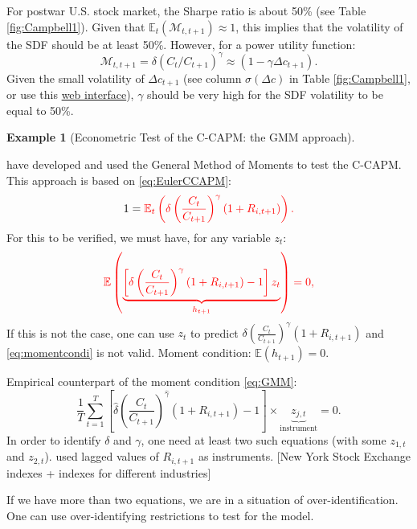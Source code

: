 \documentclass[
  12pt,
]{book}
\theoremstyle{definition}
\theoremstyle{definition}
\newtheorem{example}{Example}[chapter]
\theoremstyle{definition}
\theoremstyle{definition}
\theoremstyle{remark}
\begin{document}
For postwar U.S. stock market, the Sharpe ratio is about 50\% (see Table \ref{fig:Campbell1}). Given that \(\mathbb{E}_t(\mathcal{M}_{t,t+1}) \approx 1\), this implies that the volatility of the SDF should be at least 50\%.
However, for a power utility function:
\[
\mathcal{M}_{t,t+1}=\delta (C_t/C_{t+1})^\gamma \approx (1 - \gamma \Delta c_{t+1}).
\]
Given the small volatility of \(\Delta c_{t+1}\) (see column \(\sigma(\Delta c)\) in Table \ref{fig:Campbell1}, or use this \href{https://jrenne.shinyapps.io/APModels}{web interface}), \(\gamma\) should be very high for the SDF volatility to be equal to 50\%.

\begin{example}[Econometric Test of the C-CAPM: the GMM approach]
\protect\hypertarget{exm:GMM}{}\label{exm:GMM}

\citet{Hansen_Singleton_1982} have developed and used the General Method of Moments to test the C-CAPM. This approach is based on \eqref{eq:EulerCCAPM}:
\begin{equation}
1 = \color{red}{\mathbb{E}_t}\left( \delta \left(\frac{C_t}{C_{t+1}}\right)^\gamma (1+R_{i,t+1})\right).\label{eq:momentcondi}
\end{equation}
For this to be verified, we must have, for any variable \(z_t\):
\begin{equation}
\color{red}{\mathbb{E}}\left( \underbrace{\left[\delta \left(\frac{C_t}{C_{t+1}}\right)^\gamma (1+R_{i,t+1}) - 1\right] z_t}_{h_{t+1}}\right) = 0,\label{eq:GMM}
\end{equation}
If this is not the case, one can use \(z_t\) to predict \(\delta \left(\frac{C_t}{C_{t+1}}\right)^\gamma (1+R_{i,t+1})\) and \eqref{eq:momentcondi} is not valid. Moment condition: \(\mathbb{E}(h_{t+1})=0\).

Empirical counterpart of the moment condition \eqref{eq:GMM}:
\begin{equation}
\frac{1}{T}\sum_{t=1}^{T} \left[\hat\delta \left(\frac{C_t}{C_{t+1}}\right)^{\hat\gamma} (1+R_{i,t+1}) - 1\right] \times\underbrace{z_{j,t}}_{\mbox{instrument}} = 0.
\end{equation}
In order to identify \(\delta\) and \(\gamma\), one need at least two such equations (with some \(z_{1,t}\) and \(z_{2,t}\)). \citet{Hansen_Singleton_1982} used lagged values of \(R_{i,t+1}\) as instruments. {[}New York Stock Exchange indexes + indexes for different industries{]}

If we have more than two equations, we are in a situation of over-identification. One can use over-identifying restrictions to test for the model.


\end{example}
\end{document}
